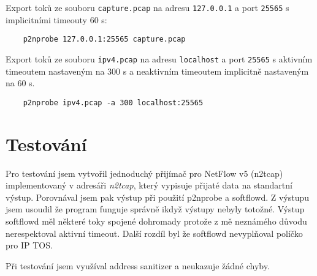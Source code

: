 \documentclass{article}
\begin{document}
Export toků ze souboru \verb|capture.pcap| na adresu \verb|127.0.0.1| a port
\verb|25565| s implicitními timeouty 60 s:
\begin{verbatim}
    p2nprobe 127.0.0.1:25565 capture.pcap
\end{verbatim}

Export toků ze souboru \verb|ipv4.pcap| na adresu \verb|localhost| a port
\verb|25565| s aktivním timeoutem nastaveným na 300 s a neaktivním timeoutem
implicitně nastaveným na 60 s.
\begin{verbatim}
    p2nprobe ipv4.pcap -a 300 localhost:25565
\end{verbatim}

\section{Testování}
Pro testování jsem vytvořil jednoduchý přijímač pro NetFlow v5 (n2tcap)
implementovaný v adresáři \textit{n2tcap}, který vypisuje přijaté data na
standartní výstup. Porovnával jsem pak výstup při použití p2nprobe a softflowd.
Z výstupu jsem usoudil že program funguje správně ikdyž výstupy nebyly totožné.
Výstup softflowd měl některé toky spojené dohromady protože z mě neznámého
důvodu nerespektoval aktivní timeout. Další rozdíl byl že softflowd nevyplňoval
políčko pro IP TOS.

Při testování jsem využíval address sanitizer a neukazuje žádné chyby.
\end{document}
